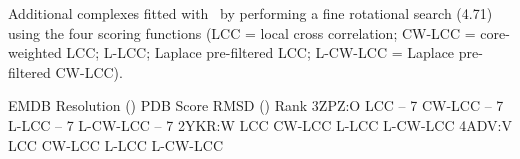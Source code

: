 \caption{}
{Additional complexes fitted with \powerfit\ by performing a fine rotational
search (4.71\Deg) using the four scoring functions (LCC = local cross correlation;
CW-LCC = core-weighted LCC; L-LCC; Laplace pre-filtered LCC; L-CW-LCC = Laplace
pre-filtered CW-LCC).}
\stopbuffer

\bTABLE
\setupTABLE[width=broad, align={center, lohi}]
\setupTABLE[r][first][style={smallbold}]
\setupTABLE[c][first][style={smallbold}]
\bTABLEhead
\bTR \bTD EMDB \eTD \bTD Resolution (\Angstrom) \eTD \bTD PDB \eTD \bTD Score \eTD \bTD RMSD (\Angstrom) \eTD \bTD Rank \eTD \eTR
\eTABLEhead
\bTABLEbody
\bTR {} \eTD {} \eTD \bTD[nr=4] 3ZPZ:O \eTD \bTD LCC \eTD {} \eTD {} -- 7 \eTD \eTR
\bTR \bTD CW-LCC \eTD {} \eTD {} -- 7 \eTD \eTR
\bTR \bTD L-LCC \eTD {} \eTD {} -- 7 \eTD \eTR
\bTR \bTD L-CW-LCC \eTD {} \eTD {} -- 7 \eTD \eTR
%
\bTR {} \eTD {} \eTD \bTD[nr=4] 2YKR:W \eTD \bTD LCC \eTD {} \eTD {} \eTD \eTR
\bTR \bTD CW-LCC \eTD {} \eTD {} \eTD \eTR
\bTR \bTD L-LCC \eTD {} \eTD {} \eTD \eTR
\bTR \bTD L-CW-LCC \eTD {} \eTD {} \eTD \eTR
%
\bTR {} \eTD {} \eTD \bTD[nr=4] 4ADV:V \eTD \bTD LCC \eTD {} \eTD {} \eTD \eTR
\bTR \bTD CW-LCC \eTD {} \eTD {} \eTD \eTR
\bTR \bTD L-LCC \eTD {} \eTD {} \eTD \eTR
\bTR \bTD L-CW-LCC \eTD {} \eTD {} \eTD \eTR
\eTABLEbody
\eTABLE
\stopbuffer
